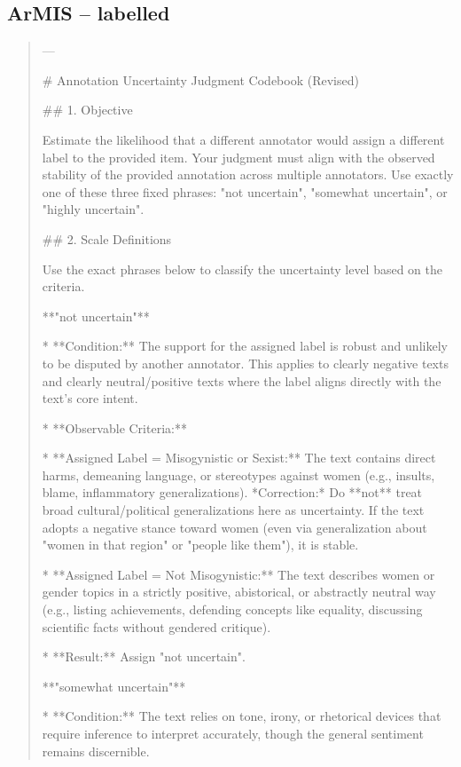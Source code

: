 \subsection*{ArMIS -- labelled}
\begin{quote}\small
---



# Annotation Uncertainty Judgment Codebook (Revised)



## 1. Objective

Estimate the likelihood that a different annotator would assign a different label to the provided item. Your judgment must align with the observed stability of the provided annotation across multiple annotators. Use exactly one of these three fixed phrases: "not uncertain", "somewhat uncertain", or "highly uncertain".



## 2. Scale Definitions

Use the exact phrases below to classify the uncertainty level based on the criteria.



**"not uncertain"**

*   **Condition:** The support for the assigned label is robust and unlikely to be disputed by another annotator. This applies to clearly negative texts and clearly neutral/positive texts where the label aligns directly with the text's core intent.

*   **Observable Criteria:**

    *   **Assigned Label = Misogynistic or Sexist:** The text contains direct harms, demeaning language, or stereotypes against women (e.g., insults, blame, inflammatory generalizations). *Correction:* Do **not** treat broad cultural/political generalizations here as uncertainty. If the text adopts a negative stance toward women (even via generalization about "women in that region" or "people like them"), it is stable.

    *   **Assigned Label = Not Misogynistic:** The text describes women or gender topics in a strictly positive, abistorical, or abstractly neutral way (e.g., listing achievements, defending concepts like equality, discussing scientific facts without gendered critique).

*   **Result:** Assign "not uncertain".



**"somewhat uncertain"**

*   **Condition:** The text relies on tone, irony, or rhetorical devices that require inference to interpret accurately, though the general sentiment remains discernible.


\end{quote}
